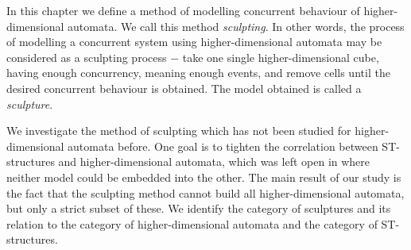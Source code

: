     
    In this chapter we define a method of modelling concurrent behaviour of higher-dimensional automata. We call this method \emph{sculpting}. In other words, the process of modelling a concurrent system using higher-dimensional automata may be considered as a sculpting process $-$ take one single higher-dimensional cube, having enough concurrency, meaning enough events, and remove cells until the desired concurrent behaviour is obtained. The model obtained is called a \emph{sculpture}.
    
    We investigate the method of sculpting which has not been studied for higher-dimensional automata before. One goal is to tighten the correlation between ST-structures and higher-dimensional automata, which was left open in \cite{Johansen16STstruct} where neither model could be embedded into the other. The main result of our study is the fact that the sculpting method cannot build all higher-dimensional automata, but only a strict subset of these. We identify the category of sculptures and its relation to the category of higher-dimensional automata and the category of ST-structures.